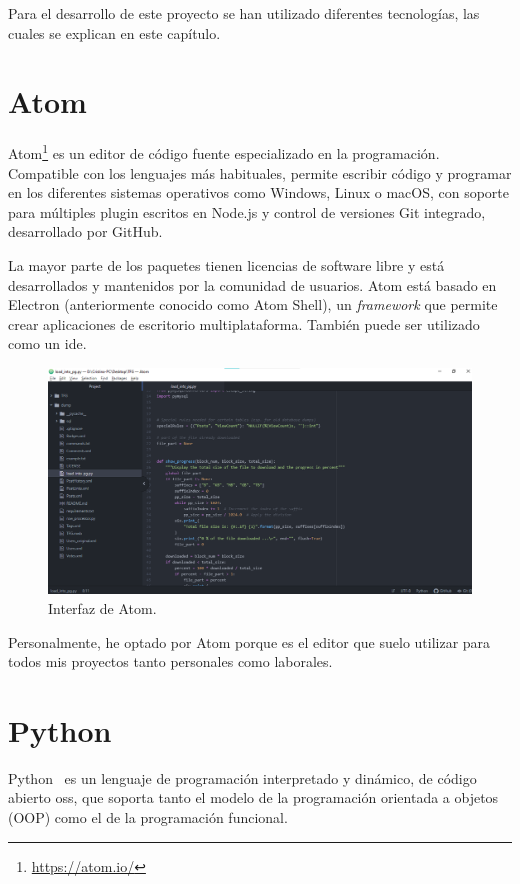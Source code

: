 \documentclass[a4paper, 12pt]{book}
\begin{document}
Para el desarrollo de este proyecto se han utilizado diferentes tecnologías, las cuales se explican en este capítulo.

\section{Atom} 
\label{sec:atom}
Atom\footnote{\url{https://atom.io/}} es un editor de código fuente especializado en la programación. Compatible con los lenguajes más habituales, permite escribir código y programar en los diferentes sistemas operativos como Windows, Linux o macOS, con soporte para múltiples \gls{plugin} escritos en Node.js y control de versiones Git integrado, desarrollado por GitHub. 

La mayor parte de los paquetes tienen licencias de software libre y está desarrollados y mantenidos por la comunidad de usuarios. Atom está basado en Electron (anteriormente conocido como Atom Shell), un \textit{framework} que permite crear aplicaciones de escritorio multiplataforma. También puede ser utilizado como un \gls{ide}.

\begin{figure}[ht]
        \centering
        \includegraphics[width=\textwidth]{img/ATOM.png}
        \caption{Interfaz de Atom.}
        \label{figura:ATOM}
    \end{figure}

Personalmente, he optado por Atom porque es el editor que suelo utilizar para todos mis proyectos tanto personales como laborales. 

\section{Python} 
\label{sec:Python}

Python~\cite{van2007python} es un lenguaje de programación interpretado y dinámico, de código abierto \gls{oss}, que soporta tanto el modelo de la programación orientada a objetos (OOP) como el de la programación funcional.
\end{document}
